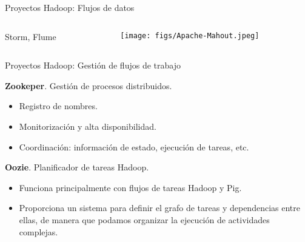 
\begin{frame}{Proyectos Hadoop: Flujos de datos}
 \begin{columns}[T]
    \begin{column}{.8\textwidth}
     \begin{wideitemize}
      \item Storm, Flume
    \end{wideitemize}
    \end{column}
    
    \begin{column}{.2\textwidth}
    \vspace*{.7cm}
    \texttt{[image: figs/Apache-Mahout.jpeg]}
    \end{column}
  \end{columns}

\end{frame}


\begin{frame}{Proyectos Hadoop: Gestión de flujos de trabajo}

     \begin{wideitemize}
      \item \textbf{Zookeper}. Gestión de procesos distribuidos.
      \begin{itemize}
       \item Registro de nombres.
       \item Monitorización y alta disponibilidad.
       \item Coordinación: información de estado, ejecución de tareas, etc.
      \end{itemize}
      
      \item \textbf{Oozie}. Planificador de tareas Hadoop.
      \begin{itemize}
       \item Funciona principalmente con flujos de tareas Hadoop y Pig.
       \item Proporciona un sistema para definir el grafo de tareas y dependencias
       entre ellas, de manera que podamos organizar la ejecución de actividades
       complejas.
      \end{itemize}

    \end{wideitemize}

\end{frame}


